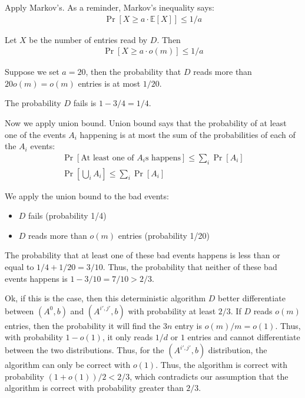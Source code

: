 \documentclass[11pt]{article}
\newcommand{\eq}[1]{\begin{align*}#1\end{align*}}
\begin{document}
Apply Markov's. As a reminder, Markov's inequality says:
\eq{
\Pr\left[X \geq a \cdot \mathbb{E}[X]\right] \leq 1/a
}

Let $X$ be the number of entries read by $D$. Then
\eq{
\Pr[X \geq a \cdot o(m)] \leq 1/a
}

Suppose we set $a = 20$, then the probability that $D$ reads more than $20o(m) = o(m)$ entries is at most $1/20$.

The probability $D$ fails is $1 - 3/4 = 1/4$.

Now we apply union bound. Union bound says that the probability of at least one of the events $A_i$ happening is at most the sum of the probabilities of each of the $A_i$ events:
\eq{
\Pr[\text{At least one of $A_i$s happens}] \leq \sum_i \Pr[A_i] \\
\Pr[\bigcup_i A_i] \leq \sum_i \Pr[A_i]
}

We apply the union bound to the bad events:
\begin{itemize}
\item $D$ fails (probability 1/4)
\item $D$ reads more than $o(m)$ entries (probability 1/20)
\end{itemize}

The probability that at least one of these bad events happens is less than or equal to $1/4 + 1/20 = 3/10$. Thus, the probability that neither of these bad events happens is $1 - 3/10 = 7/10 > 2/3$.

Ok, if this is the case, then this deterministic algorithm $D$ better differentiate between $(A^0, b)$ and $(A^{i',j'},b)$ with probability at least $2/3$. If $D$ reads $o(m)$ entries, then the probability it will find the $3n$ entry is $o(m)/m = o(1)$. Thus, with probability $1 - o(1)$, it only reads $1/d$ or $1$ entries and cannot differentiate between the two distributions. Thus, for the $(A^{i',j'},b)$ distribution, the algorithm can only be correct with $o(1)$. Thus, the algorithm is correct with probability $(1 + o(1))/2 < 2/3$, which contradicts our assumption that the algorithm is correct with probability greater than $2/3$.
\end{document}

